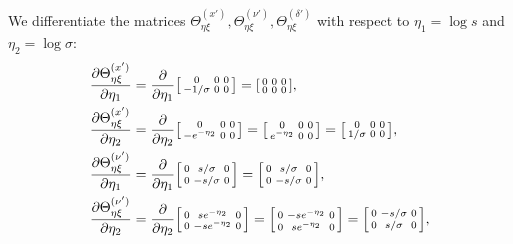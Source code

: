 \documentclass{article}
\begin{document}
We differentiate the matrices $\Theta_{\eta\xi}^{(x')}, \Theta_{\eta\xi}^{(\nu')}, \Theta_{\eta\xi}^{(\delta')}$ with respect to $\eta_1 = \log s$ and $\eta_2 = \log \sigma$:
%
\begin{align}
  \frac{\partial \Theta_{\eta\xi}^{(x')}}{\partial \eta_1}      & = \frac{\partial}{\partial \eta_1} \begin{bsmallmatrix} 0 & 0 & 0 \\ -1/\sigma & 0 & 0 \end{bsmallmatrix} = \begin{bsmallmatrix} 0 & 0 & 0 \\ 0 & 0 & 0 \end{bsmallmatrix},                                   \\
  \frac{\partial \Theta_{\eta\xi}^{(x')}}{\partial \eta_2}      & = \frac{\partial}{\partial \eta_2} \begin{bsmallmatrix} 0 & 0 & 0 \\ -e^{-\eta_2} & 0 & 0 \end{bsmallmatrix} = \begin{bsmallmatrix} 0 & 0 & 0 \\ e^{-\eta_2} & 0 & 0 \end{bsmallmatrix} = \begin{bsmallmatrix} 0 & 0 & 0 \\ 1/\sigma & 0 & 0 \end{bsmallmatrix}, \\
  \frac{\partial \Theta_{\eta\xi}^{(\nu')}}{\partial \eta_1}    & = \frac{\partial}{\partial \eta_1} \begin{bsmallmatrix} 0 & s/\sigma & 0 \\ 0 & -s/\sigma & 0 \end{bsmallmatrix} = \begin{bsmallmatrix} 0 & s/\sigma & 0 \\ 0 & -s/\sigma & 0 \end{bsmallmatrix},                                   \\
  \frac{\partial \Theta_{\eta\xi}^{(\nu')}}{\partial \eta_2}    & = \frac{\partial}{\partial \eta_2} \begin{bsmallmatrix} 0 & s e^{-\eta_2} & 0 \\ 0 & -s e^{-\eta_2} & 0 \end{bsmallmatrix} = \begin{bsmallmatrix} 0 & -s e^{-\eta_2} & 0 \\ 0 & s e^{-\eta_2} & 0 \end{bsmallmatrix} = \begin{bsmallmatrix} 0 & -s/\sigma & 0 \\ 0 & s/\sigma & 0 \end{bsmallmatrix}, \\

\end{align}
\end{document}
